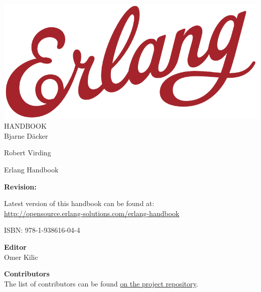 \documentclass[oneside]{book}
\begin{document}
\begin{titlepage}
\centering

\vspace*{70pt}
\includegraphics[scale=0.3]{includes/erlang-logo.png}\\[0.8\baselineskip]
{\Huge \sffamily HANDBOOK}\\
\vspace{250pt}
{\LARGE \sffamily Bjarne D\"acker}\par
{\LARGE \sffamily Robert Virding}\par

\end{titlepage}


\clearpage
\thispagestyle{empty}
{\Huge Erlang Handbook}\\[0.1\baselineskip]

\vspace{20pt}
{\Large \textbf{Revision:}\\[0.2\baselineskip]
\immediate{}

\immediate{}
}

\vspace{20pt}
{\large Latest version of this handbook can be found at:\\
\url{http://opensource.erlang-solutions.com/erlang-handbook}}

ISBN: 978-1-938616-04-4

\vfill

\textbf{Editor}\\[0.1\baselineskip]
Omer Kilic

\textbf{Contributors}\\[0.1\baselineskip]
The list of contributors can be found \href{https://github.com/esl/erlang-handbook/graphs/contributors}{on the project repository}.
\end{document}
